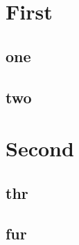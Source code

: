\documentclass[openany]{book}
\begin{document}
\tableofcontents
\chapter{First}
\section{one} \lipsum[1]
\section{two} \lipsum[2]
%
\chapter{Second}
\section{thr} \lipsum[3]
\section{fur} \lipsum[4]
\end{document}
